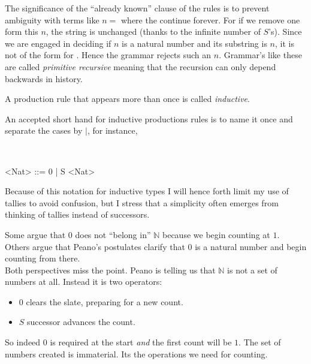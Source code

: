 The significance of the ``already known'' clause of the rules is to prevent ambiguity 
with terms like $n=$ where the  continue forever.
For if we remove one  form this $n$, the string is unchanged (thanks to 
the infinite number of $S$'s).  Since we are engaged in deciding if $n$ is a natural number and its substring 
is $n$, it is not of the form  for .  Hence the grammar 
rejects such an $n$.  Grammar's like these are called \emph{primitive recursive}
meaning that the recursion can only depend backwards 
in history.

\begin{definition}
    A production rule that appears more than once is called \emph{inductive}.
\end{definition}

An accepted short hand for inductive productions rules is to name it once 
and separate the cases by $\mid$, for instance,
\begin{center}
 \\
\begin{Gcode}[]
<Nat> ::= 0 
        | S <Nat>
\end{Gcode}
\end{center}
Because of this notation for inductive types I will hence forth limit my use of tallies
to avoid confusion, but I stress that a simplicity often emerges from thinking 
of tallies instead of successors.
    

\begin{remark}{}
    Some argue that $0$ does not ``belong in'' $\mathbb{N}$ because 
    we begin counting at $1$.  Others argue that Peano's postulates
    clarify that $0$ is a natural number and begin counting from there.\\

    Both perspectives miss the point.  Peano is telling us that $\mathbb{N}$
    is not a set of numbers at all.  Instead it is two operators:
    \begin{itemize}
        \item $0$ clears the slate, preparing for a new count.
        \item $S$ successor advances the count.
    \end{itemize}
    So indeed $0$ is required at the start \emph{and} the first count will be $1$.
    The set of numbers created is immaterial.  Its the operations we need for counting.
\end{remark}

